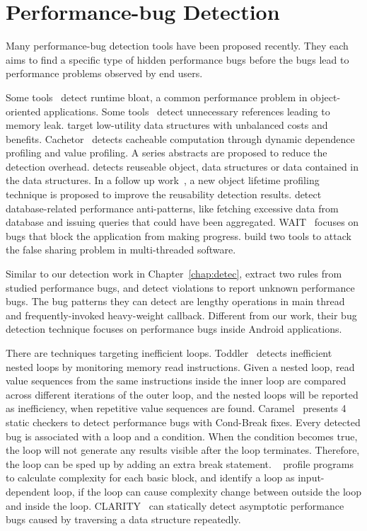 \section{Performance-bug Detection}
\label{sec:2_detect}

Many performance-bug detection tools have been proposed recently.
They each aims to find a specific type of hidden
performance bugs before the bugs lead to performance problems observed by
end users.

Some tools~\citep{BloatFSE2008, XuBloatPLDI2009, XuBloatPLDI2010, PerfBlower}
detect runtime bloat, a common performance problem in object-oriented 
applications.
Some tools~\citep{LeakChaser, JavaMemoryLeak} detect unnecessary references leading to memory leak. 
\citet{XuDataStructure} target 
low-utility data structures with unbalanced costs and benefits.
Cachetor~\citep{Cachetor} detects cacheable computation through dynamic dependence profiling and value profiling. 
A series abstracts are proposed to reduce the detection overhead. 
\citet{Reusable} detects reuseable object, 
data structures or data contained in the data structures. 
In a follow up work~\citep{Resurrector}, 
a new object lifetime profiling technique is proposed to improve the reusability detection results. 
\citet{ORMPatterns} detect database-related performance anti-patterns,
like fetching excessive data from database and issuing queries that could have
been aggregated.
WAIT~\citep{WAIT} focuses on bugs that
block the application from making progress.
\citet{falsesharing} build two tools to attack the false 
sharing problem in multi-threaded software.

Similar to our detection work in Chapter~\ref{chap:detec}, 
\citet{SmartphoneStudy} extract two rules from studied performance bugs, 
and detect violations to report unknown performance bugs. 
The bug patterns they can detect are lengthy operations 
in main thread and frequently-invoked heavy-weight callback. 
Different from our work, their bug detection technique focuses on 
performance bugs inside Android applications. 

There are techniques targeting inefficient loops.
Toddler~\citep{Alabama} detects inefficient nested loops by monitoring memory read instructions. 
Given a nested loop, read value sequences from the same instructions inside the inner 
loop are compared across different iterations of the outer loop, 
and the nested loops will be reported as inefficiency, when repetitive value sequences are found.
Caramel~\citep{CARAMEL} presents 4 static checkers to detect performance bugs with Cond-Break fixes. 
Every detected bug is associated with a loop and a condition. 
When the condition becomes true, the loop will not generate any results visible after the loop terminates. 
Therefore, the loop can be sped up by adding an extra break statement.
~\citet{xiao13:context} profile programs to calculate complexity for each basic block, 
and identify a loop as input-dependent loop, if the loop can cause complexity change between outside the loop and inside the loop. 
CLARITY~\citep{CLARITY} can statically detect asymptotic 
performance bugs caused by traversing a data structure repeatedly. 

